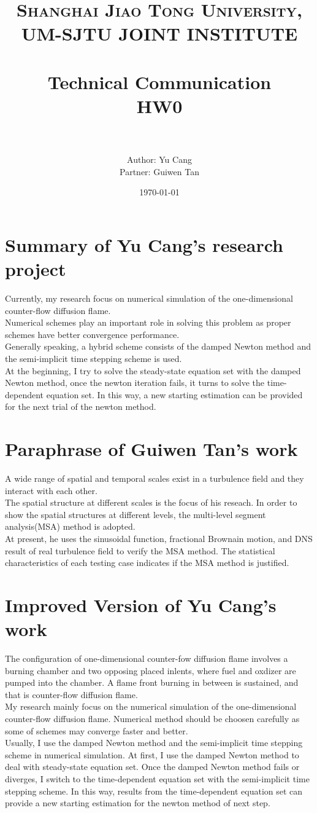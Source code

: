 \documentclass[paper=a4, fontsize=11pt]{scrartcl} %
\title{	
\normalfont \normalsize 
\textsc{Shanghai Jiao Tong University, UM-SJTU JOINT INSTITUTE} \\ [25pt] %
\horrule{0.5pt} \\[0.4cm] %
\huge Technical Communication\\ HW0 \\ %
\horrule{2pt} \\[0.5cm] %
}
\author{Author: Yu Cang \quad 018370210001\\ Partner: Guiwen Tan \quad 118370910014} %
\date{\normalsize \today} %
\numberwithin{equation}{section} %
\numberwithin{figure}{section} %
\numberwithin{table}{section} %
\begin{document}
\maketitle %

\section{Summary of Yu Cang's  research project}
	Currently, my research focus on numerical simulation of the one-dimensional  counter-flow diffusion flame.\\
	Numerical schemes play an important role in solving this problem as proper schemes have better convergence performance. \\
	Generally speaking, a hybrid scheme consists of the damped Newton method and the semi-implicit time stepping scheme is used.\\
	At the beginning, I try to solve the steady-state equation set with the damped Newton method, once the newton iteration fails, it turns to solve the time-dependent equation set. In this way,  a new starting estimation can be provided for the next trial of the newton method. 

\section{Paraphrase of Guiwen Tan's work}
	A wide range of spatial and temporal scales exist in a turbulence field and they interact with each other.\\
	The spatial structure at different scales is the focus of his reseach. In order to show the spatial structures at different levels, the multi-level segment analysis(MSA) method is adopted.\\
	At present, he uses the sinusoidal function, fractional Brownain motion, and DNS result of real turbulence field to verify the MSA method. The statistical characteristics of each testing case indicates if the MSA method is justified.

\section{Improved Version of Yu Cang's work}
	The configuration of one-dimensional counter-fow diffusion flame involves a burning chamber and two opposing placed inlents, where fuel and oxdizer are pumped into the chamber. A flame front burning in between is sustained, and that is counter-flow diffusion flame.\\
	My research mainly focus on the numerical simulation of the one-dimensional counter-flow diffusion flame. Numerical method should be choosen carefully as some of schemes may converge faster and better. \\
	Usually, I use the damped Newton method and the semi-implicit time stepping scheme in numerical simulation. At first, I use the damped Newton method to deal with steady-state equation set. Once the damped Newton method fails or diverges, I switch to the time-dependent equation set with the semi-implicit time stepping scheme. In this way,  results from the time-dependent equation set can provide a new starting estimation for the newton method of next step.
\end{document}

